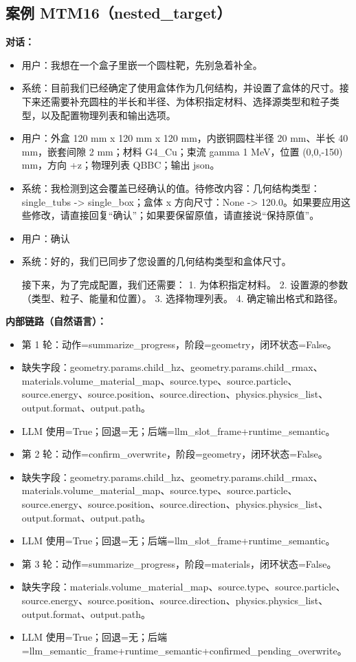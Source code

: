 \documentclass[11pt]{ctexart}
\begin{document}
\subsection{案例 MTM16（nested\_target）}
\textbf{对话：}
\begin{itemize}
\item 用户：我想在一个盒子里嵌一个圆柱靶，先别急着补全。
\item 系统：目前我们已经确定了使用盒体作为几何结构，并设置了盒体的尺寸。接下来还需要补充圆柱的半长和半径、为体积指定材料、选择源类型和粒子类型，以及配置物理列表和输出选项。
\item 用户：外盒 120 mm x 120 mm x 120 mm，内嵌铜圆柱半径 20 mm、半长 40 mm，嵌套间隙 2 mm；材料 G4\_Cu；束流 gamma 1 MeV，位置 (0,0,-150) mm，方向 +z；物理列表 QBBC；输出 json。
\item 系统：我检测到这会覆盖已经确认的值。待修改内容：几何结构类型：single\_tubs -> single\_box；盒体 x 方向尺寸：None -> 120.0。如果要应用这些修改，请直接回复“确认”；如果要保留原值，请直接说“保持原值”。
\item 用户：确认
\item 系统：好的，我们已同步了您设置的几何结构类型和盒体尺寸。

接下来，为了完成配置，我们还需要：
1.  为体积指定材料。
2.  设置源的参数（类型、粒子、能量和位置）。
3.  选择物理列表。
4.  确定输出格式和路径。
\end{itemize}
\textbf{内部链路（自然语言）：}
\begin{itemize}
\item 第 1 轮：动作=summarize\_progress，阶段=geometry，闭环状态=False。
\item 缺失字段：geometry.params.child\_hz、geometry.params.child\_rmax、materials.volume\_material\_map、source.type、source.particle、source.energy、source.position、source.direction、physics.physics\_list、output.format、output.path。
\item LLM 使用=True；回退=无；后端=llm\_slot\_frame+runtime\_semantic。
\item 第 2 轮：动作=confirm\_overwrite，阶段=geometry，闭环状态=False。
\item 缺失字段：geometry.params.child\_hz、geometry.params.child\_rmax、materials.volume\_material\_map、source.type、source.particle、source.energy、source.position、source.direction、physics.physics\_list、output.format、output.path。
\item LLM 使用=True；回退=无；后端=llm\_slot\_frame+runtime\_semantic。
\item 第 3 轮：动作=summarize\_progress，阶段=materials，闭环状态=False。
\item 缺失字段：materials.volume\_material\_map、source.type、source.particle、source.energy、source.position、source.direction、physics.physics\_list、output.format、output.path。
\item LLM 使用=True；回退=无；后端=llm\_semantic\_frame+runtime\_semantic+confirmed\_pending\_overwrite。
\end{itemize}
\end{document}
